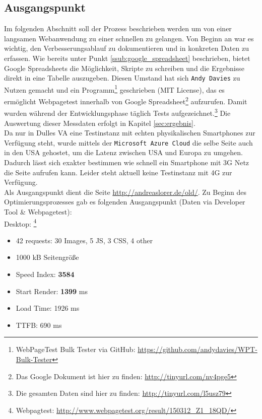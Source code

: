 	\subsection{Ausgangspunkt}
	\label{sub:ausgangspunkt}
		Im folgenden Abschnitt soll der Prozess beschrieben werden um von einer langsamen Webanwendung zu einer schnellen zu gelangen. Von Beginn an war es wichtig, den Verbesserungsablauf zu dokumentieren und in konkreten Daten zu erfassen. Wie bereits unter Punkt \ref{ssub:google_spreadsheet} beschrieben, bietet Google Spreadsheets die Möglichkeit, Skripte zu schreiben und die Ergebnisse direkt in eine Tabelle auszugeben. Diesen Umstand hat sich \texttt{Andy Davies} zu Nutzen gemacht und ein Programm\footnote{WebPageTest Bulk Tester via GitHub: \url{https://github.com/andydavies/WPT-Bulk-Tester}} geschrieben (MIT License), das es ermöglicht Webpagetest innerhalb von Google Spreadsheet\footnote{Das Google Dokument ist hier zu finden: \url{http://tinyurl.com/nv4pge5}} aufzurufen. Damit wurden während der Entwicklungsphase täglich Tests aufgezeichnet.\footnote{Die gesamten Daten sind hier zu finden: \url{http://tinyurl.com/l5usz79}} Die Auswertung dieser Messdaten erfolgt in Kapitel \ref{sec:ergebnis}.\\

		Da nur in Dulles VA eine Testinstanz mit echten physikalischen Smartphones zur Verfügung steht, wurde mittels der \texttt{Microsoft Azure Cloud} die selbe Seite auch in den USA gehostet, um die Latenz zwischen USA und Europa zu umgehen. Dadurch lässt sich exakter bestimmen wie schnell ein Smartphone mit 3G Netz die Seite aufrufen kann. Leider steht aktuell keine Testinstanz mit 4G zur Verfügung.\\

		Als Ausgangspunkt dient die Seite \url{http://andreaslorer.de/old/}. Zu Beginn des Optimierungsprozesses gab es folgenden Ausgangspunkt (Daten via Developer Tool \& Webpagetest):\\

		Desktop: \footnote{Webpagtest: \url{http://www.webpagetest.org/result/150312_Z1_18QD/}}
		\begin{itemize}
			\item 42 requests: 30 Images, 5 JS, 3 CSS, 4 other
			\item 1000 kB Seitengröße
			\item Speed Index: \textbf{3584}
			\item Start Render: \textbf{1399}  ms
			\item Load Time: 1926 ms
			\item TTFB: 690 ms
		\end{itemize}

